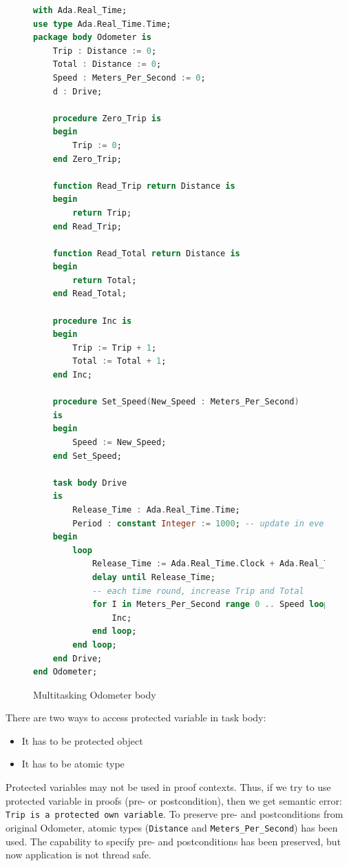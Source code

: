 \begin{figure}%
\singlespacing
\begin{lstlisting}[language=ada, frame=single, gobble=0]
with Ada.Real_Time;
use type Ada.Real_Time.Time;
package body Odometer is
    Trip : Distance := 0;
    Total : Distance := 0;
    Speed : Meters_Per_Second := 0;
    d : Drive;
    
    procedure Zero_Trip is
    begin
        Trip := 0;
    end Zero_Trip;
    
    function Read_Trip return Distance is
    begin
        return Trip;
    end Read_Trip;
    
    function Read_Total return Distance is
    begin
        return Total;
    end Read_Total;
    
    procedure Inc is
    begin
        Trip := Trip + 1;
        Total := Total + 1;
    end Inc;
    
    procedure Set_Speed(New_Speed : Meters_Per_Second)
    is
    begin
        Speed := New_Speed;
    end Set_Speed;    
    
    task body Drive
    is
        Release_Time : Ada.Real_Time.Time;
        Period : constant Integer := 1000; -- update in every second
    begin
        loop
            Release_Time := Ada.Real_Time.Clock + Ada.Real_Time.Milliseconds(Period);
            delay until Release_Time;
            -- each time round, increase Trip and Total
            for I in Meters_Per_Second range 0 .. Speed loop
                Inc;
            end loop;            
        end loop;
    end Drive;
end Odometer;
\end{lstlisting} 
\doublespacing
\caption{Multitasking Odometer body}
\label{listing:Odometer2005Tasking_body}
\end{figure}

There are two ways to access protected variable in task body:
\begin{itemize}
    \item It has to be protected object
    \item It has to be atomic type
\end{itemize}

Protected variables may not be used in proof contexts. Thus, if we try to use protected variable in proofs (pre- or postcondition), then we get semantic error: \lstinline{Trip is a protected own variable}. To preserve pre- and postconditions from original Odometer, atomic types (\lstinline{Distance} and \lstinline{Meters_Per_Second}) has been used. The capability to specify pre- and postconditions has been preserved, but now application is not thread safe.


